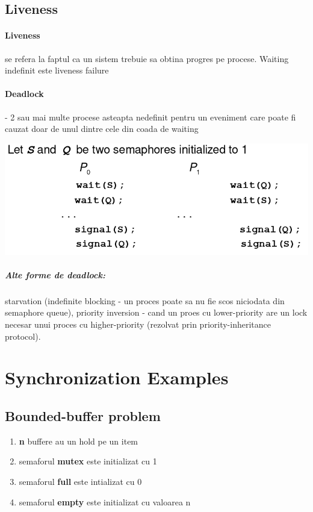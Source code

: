 \documentclass{article}
\begin{document}
\subsection*{Liveness}
\paragraph*{Liveness} se refera la faptul ca un sistem trebuie sa obtina progres pe procese. Waiting indefinit este liveness failure
\paragraph*{Deadlock} - 2 sau mai multe procese asteapta nedefinit pentru un eveniment care poate fi cauzat doar de unul dintre cele din coada de waiting

\begin{center}
    \includegraphics[scale=0.4]{16_deadlock.png}
\end{center}

\subparagraph*{Alte forme de deadlock:} starvation (indefinite blocking - un proces poate sa nu fie scos niciodata din semaphore queue), priority inversion - cand un proes cu lower-priority are un lock necesar unui proces cu higher-priority (rezolvat prin priority-inheritance protocol).
\section[Ch7 Synchronization Examples]{Synchronization Examples}
\subsection*{Bounded-buffer problem}
\begin{enumerate}
    \item \textbf{n} buffere au un hold pe un item
    \item semaforul \textbf{mutex} este initializat cu 1
    \item semaforul \textbf{full} este intializat cu 0
    \item semaforul \textbf{empty} este initializat cu valoarea n
\end{enumerate}
\end{document}
